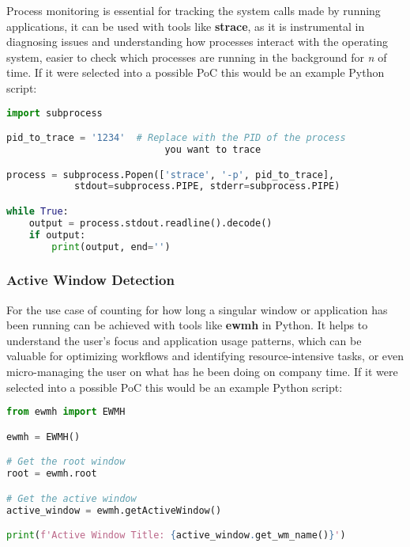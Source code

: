 \documentclass{VUMIFPSmagistrinis}
\begin{document}
Process monitoring is essential for tracking the system calls made by running applications, it can be used with tools like \textbf{strace}, as it is instrumental in diagnosing issues and understanding how processes interact with the operating system, easier to check which processes are running in the background for \textit{n} of time. If it were selected into a possible PoC this would be an example Python script:
\begin{lstlisting}[language=Python]
import subprocess

pid_to_trace = '1234'  # Replace with the PID of the process 
                            you want to trace

process = subprocess.Popen(['strace', '-p', pid_to_trace], 
            stdout=subprocess.PIPE, stderr=subprocess.PIPE)

while True:
    output = process.stdout.readline().decode()
    if output:
        print(output, end='')
\end{lstlisting}

\subsubsection{Active Window Detection}
For the use case of counting for how long a singular window or application has been running can be achieved with tools like \textbf{ewmh} in Python. It helps to understand the user's focus and application usage patterns, which can be valuable for optimizing workflows and identifying resource-intensive tasks, or even micro-managing the user on what has he been doing on company time. If it were selected into a possible PoC this would be an example Python script:
\begin{lstlisting}[language=Python]
from ewmh import EWMH

ewmh = EWMH()

# Get the root window
root = ewmh.root

# Get the active window
active_window = ewmh.getActiveWindow()

print(f'Active Window Title: {active_window.get_wm_name()}')
\end{lstlisting}
\end{document}
